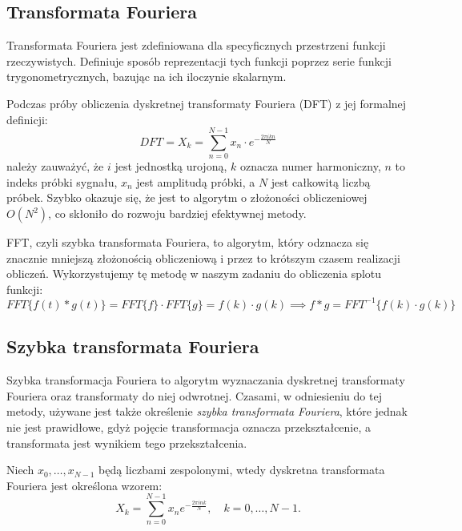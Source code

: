 \documentclass{article}
\begin{document}
\subsection{Transformata Fouriera}
Transformata Fouriera jest zdefiniowana dla specyficznych przestrzeni funkcji rzeczywistych. Definiuje sposób reprezentacji tych funkcji poprzez serie funkcji trygonometrycznych, bazując na ich iloczynie skalarnym.

\noindent
Podczas próby obliczenia dyskretnej transformaty Fouriera (DFT) z jej formalnej definicji:
\begin{equation*}
    DFT = X_k = \sum_{n=0}^{N-1} x_n \cdot e^{- \frac{2\pi i k n}{N}}
\end{equation*}
należy zauważyć, że \( i \) jest jednostką urojoną, \( k \) oznacza numer harmoniczny, \( n \) to indeks próbki sygnału, \( x_n \) jest amplitudą próbki, a \( N \) jest całkowitą liczbą próbek. Szybko okazuje się, że jest to algorytm o złożoności obliczeniowej \( O(N^2) \), co skłoniło do rozwoju bardziej efektywnej metody.

\noindent
FFT, czyli szybka transformata Fouriera, to algorytm, który odznacza się znacznie mniejszą złożonością obliczeniową i przez to krótszym czasem realizacji obliczeń. Wykorzystujemy tę metodę w naszym zadaniu do obliczenia splotu funkcji:
\begin{equation*}
    FFT\{f(t) * g(t)\} = FFT\{f\} \cdot FFT\{g\} = f(k) \cdot g(k) \implies f * g = FFT^{-1}\{f(k) \cdot g(k)\}
\end{equation*}

\subsection{Szybka transformata Fouriera}

\noindent
Szybka transformacja Fouriera to algorytm wyznaczania dyskretnej transformaty Fouriera oraz transformaty do niej odwrotnej. Czasami, w odniesieniu do tej metody, używane jest także określenie \textit{szybka transformata Fouriera}, które jednak nie jest prawidłowe, gdyż pojęcie transformacja oznacza przekształcenie, a transformata jest wynikiem tego przekształcenia.

\noindent
Niech \(x_0, \dots, x_{N-1}\) będą liczbami zespolonymi, wtedy dyskretna transformata Fouriera jest określona wzorem:
\begin{equation*}
    X_k = \sum_{n=0}^{N-1} x_n e^{- \frac{2\pi i nk}{N}}, \quad k = 0, \dots, N - 1.
\end{equation*}
\end{document}
